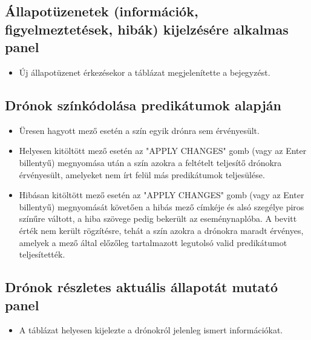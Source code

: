 \subsection{Állapotüzenetek (információk, figyelmeztetések, hibák) kijelzésére alkalmas panel}

\begin{itemize}

  \item Új állapotüzenet érkezésekor a táblázat megjelenítette a bejegyzést.

\end{itemize}


\subsection{Drónok színkódolása predikátumok alapján}

\begin{itemize}

  \item Üresen hagyott mező esetén a szín egyik drónra sem érvényesült.

  \item Helyesen kitöltött mező esetén az "APPLY CHANGES" gomb (vagy az Enter
  billentyű) megnyomása után a szín azokra a feltételt teljesítő drónokra
  érvényesült, amelyeket nem írt felül más predikátumok teljesülése.

  \item Hibásan kitöltött mező esetén az "APPLY CHANGES" gomb (vagy az Enter
  billentyű) megnyomását követően a hibás mező címkéje és alsó szegélye piros
  színűre váltott, a hiba szövege pedig bekerült az eseménynaplóba. A bevitt
  érték nem került rögzítésre, tehát a szín azokra a drónokra maradt érvényes,
  amelyek a mező által előzőleg tartalmazott legutolsó valid predikátumot
  teljesítették.

\end{itemize}


\subsection{Drónok részletes aktuális állapotát mutató panel}

\begin{itemize}

  \item A táblázat helyesen kijelezte a drónokról jelenleg ismert információkat.

\end{itemize}


